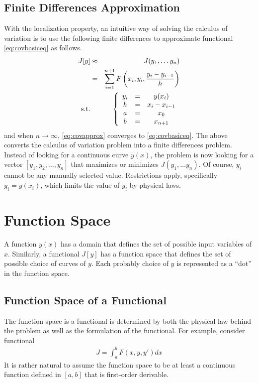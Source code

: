 \subsection{Finite Differences Approximation}

With the localization property, an intuitive way of solving the calculus of variation is to use the following finite differences to approximate functional \eqref{eq:covbasiceq} as follows.
\begin{eqnarray}
	J[y] &\approx& J(y_1, \ldots y_n) \nonumber \\
	&=& \sum_{i=1}^{n+1} F\left(x_i, y_i, \frac{y_i-y_{i-1}}{h}\right) \label{eq:covapprox} \\
	\textup{s.t.} && \left\{\begin{array}{ccc}
		y_i &=& y(x_i) \\
		h &=& x_i - x_{i-1} \\
		a &=& x_0 \\
		b &=& x_{n+1}
	\end{array}\right. \nonumber
\end{eqnarray}
and when $n\rightarrow\infty$, \eqref{eq:covapprox} converges to \eqref{eq:covbasiceq}. The above converts the calculus of variation problem into a finite differences problem. Instead of looking for a continuous curve $y(x)$, the problem is now looking for a vector $[y_1, y_2, \ldots, y_n]$ that maximizes or minimizes $ J(y_1, \ldots y_n)$. Of course, $y_i$ cannot be any manually selected value. Restrictions apply, specifically $y_i = y(x_i)$, which limits the value of $y_i$ by physical laws.

\section{Function Space}

A function $y(x)$ has a domain that defines the set of possible input variables of $x$. Similarly, a functional $J[y]$ has a function space that defines the set of possible choice of curves of $y$. Each probably choice of $y$ is represented as a ``dot'' in the function space.

\subsection{Function Space of a Functional}

The function space is a functional is determined by both the physical law behind the problem as well as the formulation of the functional. For example, consider functional
\begin{eqnarray}
	J = \int_{a}^{b} F\left(x, y, y\prime\right)dx \nonumber
\end{eqnarray}
It is rather natural to assume the function space to be at least a continuous function defined in $[a,b]$ that is first-order derivable.

